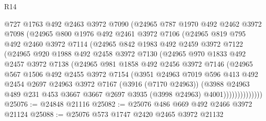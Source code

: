 \begin{lexlean}{R14}
\begin{coremodule}
            @727
            @1763
            @492
            @2463
            @3972
            @7090
            (@24965
              @787
              @1970
              @492
              @2462
              @3972
              @7098
              (@24965
                @800
                @1976
                @492
                @2461
                @3972
                @7106
                (@24965
                  @819
                  @795
                  @492
                  @2460
                  @3972
                  @7114
                  (@24965
                    @842
                    @1983
                    @492
                    @2459
                    @3972
                    @7122
                    (@24965
                      @920
                      @1988
                      @492
                      @2458
                      @3972
                      @7130
                      (@24965
                        @970
                        @1833
                        @492
                        @2457
                        @3972
                        @7138
                        (@24965
                          @981
                          @1858
                          @492
                          @2456
                          @3972
                          @7146
                          (@24965
                            @567
                            @1506
                            @492
                            @2455
                            @3972
                            @7154
                            (@3951
                              @24963
                              @7019
                              @596
                              @413
                              @492
                              @2454
                              @2697
                              @24963
                              @3972
                              @7167
                              (@3916 (@7170 @24963))
                              (@3988
                                @24963
                                @489
                                @231
                                @453
                                @3667
                                @3667
                                @2697
                                @3935
                                (@3998 @24963)
                                @4001))))))))))))))
@25076 := @24848 @21116
@25082 := @25076 @486 @669 @492 @2466 @3972 @21124
@25088 := @25076 @573 @1747 @2420 @2465 @3972 @21132

\end{coremodule}
\end{lexlean}
